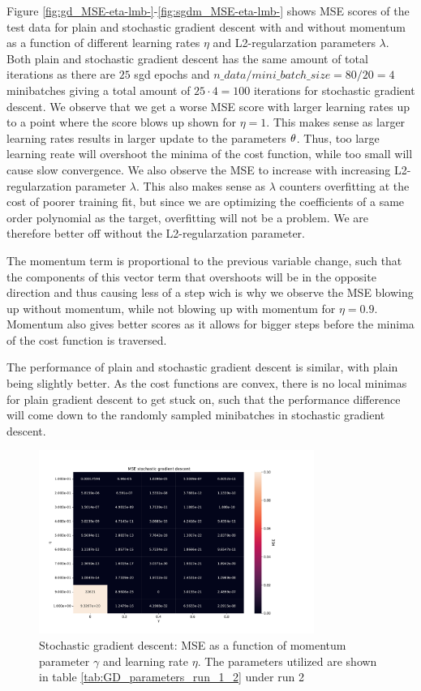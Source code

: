 Figure \ref{fig:gd_MSE-eta-lmb-}-\ref{fig:sgdm_MSE-eta-lmb-} shows MSE scores of the test data for 
plain and stochastic gradient descent with and without momentum as a function of
different learning rates \(\eta \) and L2-regularzation parameters \(\lambda \). Both plain and 
stochastic gradient descent has the same amount of total iterations as there are $25$ sgd epochs 
and $n\_data/mini\_batch\_size=80/20=4$ minibatches giving a total amount of $25 \cdot 4 = 100$ 
iterations for stochastic gradient descent. We observe that we get a worse MSE score with larger 
learning rates up to a point where the score blows up shown for $\eta=1$. This makes sense as larger 
learning rates results in larger update to the parameters $\bf{\theta } $. Thus, too large learning reate 
will overshoot the minima of the cost function, while too small will cause slow convergence.  
We also observe the MSE to increase with increasing L2-regularzation parameter $\lambda $. This also 
makes sense as $\lambda $ counters overfitting at the cost of poorer training fit, but since we are 
optimizing the coefficients of a same order polynomial as the target, overfitting will not be a problem.
We are therefore better off without the L2-regularzation parameter. 

The momentum 
term is proportional to the previous variable change, such that the components of this vector term that overshoots will  
be in the opposite direction and thus causing less of a step wich is why we observe the MSE blowing up without momentum,
while not blowing up with momentum for $\eta =0.9$. Momentum also gives better scores as it allows for bigger steps
before the minima of the cost function is traversed. 

The performance of plain and stochastic gradient descent is similar, with plain being slightly better. As the 
cost functions are convex, there is no local minimas for plain gradient descent to get stuck on, such that the 
performance difference will come down to the randomly sampled minibatches in stochastic gradient descent. 



\begin{figure}[H]
\centering
\includegraphics[width=0.8\textwidth]{Figures/PartA/_sgdm_MSE(eta,momentum)}
\caption{Stochastic gradient descent: MSE as a function of momentum parameter
    $\gamma$  and learning rate \(\eta \). The parameters utilized are shown in table \ref{tab:GD_parameters_run_1_2} under run 2	 }
\label{fig:_sgdm_MSE-eta-momentum-}
\end{figure}

